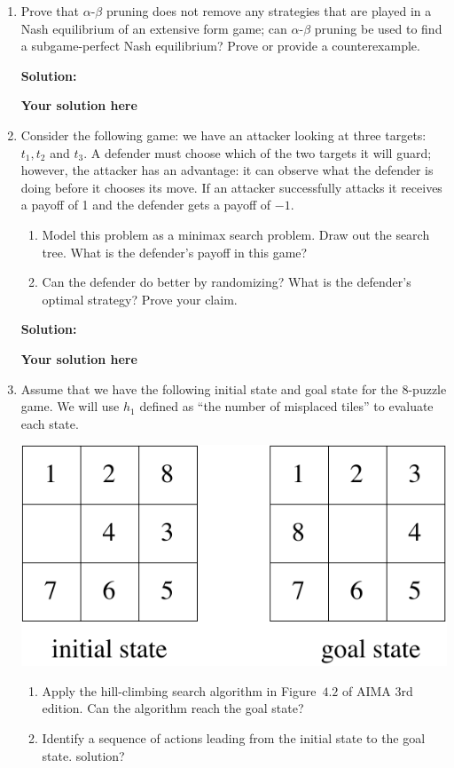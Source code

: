 \documentclass[12pt,letterpaper,pdftex]{report}
\theoremstyle{definition}
\begin{document}
\begin{enumerate}
\item Prove that $\alpha$-$\beta$ pruning does not remove any strategies that
are played in a Nash equilibrium of an extensive form game; can $\alpha$-$\beta$
pruning be used to find a subgame-perfect Nash equilibrium? Prove or provide a
counterexample. 

\noindent \textbf{Solution:}

\textbf{Your solution here}

    
\item Consider the following game: we have an attacker looking at three targets:
$t_1,t_2$ and $t_3$. A defender must choose which of the two targets it will
guard; however, the attacker has an advantage: it can observe what the defender
is doing before it chooses its move. If an attacker successfully attacks it
receives a payoff of 1 and the defender gets a payoff of $-1$. 
\begin{enumerate}
	\item Model this problem as a minimax search problem. Draw out the search
	tree. What is the defender's payoff in this game?
	\item Can the defender do better by randomizing? What is the defender's
	optimal strategy? Prove your claim. 
\end{enumerate}



\noindent \textbf{Solution:}

\textbf{Your solution here}


\item Assume that we have the following initial state and goal state for the
8-puzzle game.  We will use $h_1$ defined as ``the number of misplaced tiles''
to evaluate each state.
\begin{center}
\includegraphics[totalheight=1.5in]{week6images/8puzzle.pdf}
\end{center}
\begin{enumerate}
	\item Apply the hill-climbing search algorithm in Figure~$4.2$ of AIMA $3$rd
	edition. Can the algorithm reach the goal state?
	\item Identify a sequence of actions leading from the initial state to the
	goal state. %
	solution?
\end{enumerate}




\end{enumerate}
\end{document}

